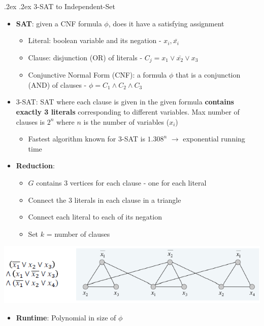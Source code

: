 \documentclass[10pt,landscape,a4paper]{article}
\makeatletter
\renewcommand{\subsection}{\@startsection{subsection}{1}{0mm}%
    {.2ex}%
    {.2ex}%
    {\sffamily\bfseries}}
\makeatother
\begin{document}
\begin{multicols*}{4}
	\subsection{3-SAT to Independent-Set}
	\begin{itemize}
		\item \textbf{SAT}: given a CNF formula $\phi$, does it have a satisfying assignment
		      \begin{itemize}
			      \item Literal: boolean variable and its negation - $x_i, \bar{x_i}$
			      \item Clause: disjunction (OR) of literals - $C_j=x_1 \vee \bar{x_2} \vee x_3$
			      \item Conjunctive Normal Form (CNF): a formula $\phi$ that is a conjunction (AND) of clauses - $\phi=C_1 \wedge C_2 \wedge C_3$
		      \end{itemize}
		\item 3-SAT: SAT where each clause is given in the given formula \textbf{contains exactly 3 literals} corresponding to different variables. Max number of clauses is $2^n$ where $n$ is the number of variables ($x_i$)
		      \begin{itemize}
			      \item Fastest algorithm known for 3-SAT is $1.308^n$ $\rightarrow$ exponential running time
		      \end{itemize}
		\item \textbf{Reduction}:
		      \begin{itemize}
			      \item $G$ contains 3 vertices for each clause - one for each literal
			      \item Connect the 3 literals in each clause in a triangle
			      \item Connect each literal to each of its negation
			      \item Set $k$ = number of clauses
		      \end{itemize}
	\end{itemize}
	\begin{center}
		\includegraphics[width=0.6\columnwidth]{3-sat}
	\end{center}
	\begin{itemize}
		\item \textbf{Runtime}: Polynomial in size of $\phi$

\end{itemize}
\end{multicols*}
\end{document}

